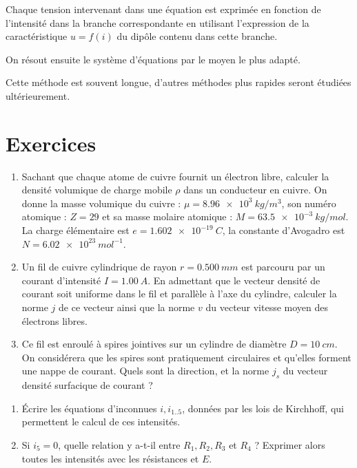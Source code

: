 Chaque tension intervenant dans une équation est exprimée en fonction de l'intensité dans la branche correspondante en utilisant l'expression de la caractéristique \(u = f(i)\) du dipôle contenu dans cette branche.

On résout ensuite le système d'équations par le moyen le plus adapté.

Cette méthode est souvent longue, d'autres méthodes plus rapides seront étudiées ultérieurement.

\section{Exercices}
\label{chap9-sec:exercices}

\begin{exercice}
  \begin{enumerate}
  \item Sachant que chaque atome de cuivre fournit un électron libre, calculer la densité volumique de charge mobile \(\rho\) dans un conducteur en cuivre. On donne la masse volumique du cuivre : \(\mu = \SI{8,96e3}{kg/m^3}\), son numéro atomique : \(Z = 29\) et sa masse molaire atomique : \(M = \SI{63,5e-3}{kg/mol}\). La charge élémentaire est \(e = \SI{1,602e-19}{C}\), la constante d'Avogadro est \(N  = \SI{6,02e23}{mol^{-1}}\).
  \item Un fil de cuivre cylindrique de rayon \(r = \SI{0,500}{mm}\) est parcouru par un courant d'intensité \(I = \SI{1,00}{A}\). En admettant que le vecteur densité de courant soit uniforme dans le fil et parallèle à l'axe du cylindre, calculer la norme \(j\) de ce vecteur ainsi que la norme \(v\) du vecteur vitesse moyen des électrons libres.
  \item Ce fil est enroulé à spires jointives sur un cylindre de diamètre \(D = \SI{10}{cm}\). On considérera que les spires sont pratiquement circulaires et qu'elles forment une nappe de courant. Quels sont la direction, et la norme \(j_s\) du vecteur densité surfacique de courant ?
  \end{enumerate}
\end{exercice}
\begin{exercice}
  \begin{enumerate}
  \item Écrire les équations d'inconnues \(i, i_{1 .. 5}\), données par les lois de Kirchhoff, qui permettent le calcul de ces intensités.
  \item Si \(i_5 = 0\), quelle relation y a-t-il entre \(R_1, R_2, R_3\) et \(R_4\) ? Exprimer alors toutes les intensités avec les résistances et \(E\).
  \end{enumerate}
\end{exercice}
